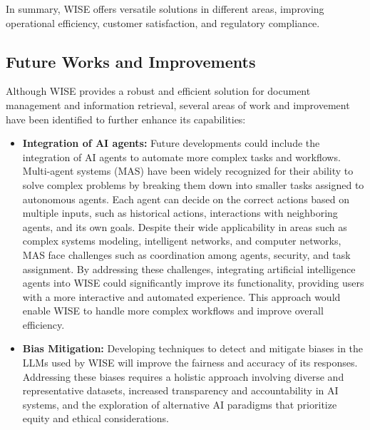 In summary, WISE offers versatile solutions in different areas, improving operational efficiency, customer satisfaction, and regulatory compliance.



\subsection{Future Works and Improvements}

Although WISE provides a robust and efficient solution for document management and information retrieval, several areas of work and improvement have been identified to further enhance its capabilities:

\begin{itemize}
    \item \textbf{Integration of AI agents:} Future developments could include the integration of AI agents to automate more complex tasks and workflows. Multi-agent systems (MAS) have been widely recognized for their ability to solve complex problems by breaking them down into smaller tasks assigned to autonomous agents. Each agent can decide on the correct actions based on multiple inputs, such as historical actions, interactions with neighboring agents, and its own goals. Despite their wide applicability in areas such as complex systems modeling, intelligent networks, and computer networks, MAS face challenges such as coordination among agents, security, and task assignment. By addressing these challenges, integrating artificial intelligence agents into WISE could significantly improve its functionality, providing users with a more interactive and automated experience. This approach would enable WISE to handle more complex workflows and improve overall efficiency. \cite{dorri2018multi}

    \item \textbf{Bias Mitigation:} Developing techniques to detect and mitigate biases in the LLMs used by WISE will improve the fairness and accuracy of its responses. Addressing these biases requires a holistic approach involving diverse and representative datasets, increased transparency and accountability in AI systems, and the exploration of alternative AI paradigms that prioritize equity and ethical considerations. \cite{ferrara2023fairness}


\end{itemize}
